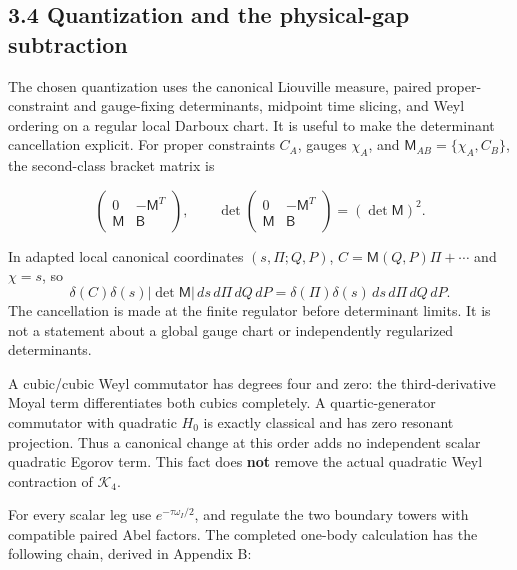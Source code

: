 \documentclass[a4paper,11pt]{article}
\numberwithin{equation}{section}
\begin{document}
\hypertarget{quantization-and-the-physical-gap-subtraction}{%
\subsection{3.4 Quantization and the physical-gap subtraction}\label{quantization-and-the-physical-gap-subtraction}}

The chosen quantization uses the canonical Liouville measure, paired proper-constraint and gauge-fixing determinants, midpoint time slicing, and Weyl ordering on a regular local Darboux chart. It is useful to make the determinant cancellation explicit. For proper constraints \(C_A\), gauges \(\chi_A\), and \(\mathsf M_{AB}=\{\chi_A,C_B\}\), the second-class bracket matrix is

\[
\begin{pmatrix}0&-\mathsf M^T\\ \mathsf M&\mathsf B\end{pmatrix},
\qquad
\det\begin{pmatrix}0&-\mathsf M^T\\ \mathsf M&\mathsf B\end{pmatrix}
=(\det\mathsf M)^2 .
\tag{3.14}
\]

In adapted local canonical coordinates \((s,\Pi;Q,P)\), \(C=\mathsf M(Q,P)\Pi+\cdots\) and \(\chi=s\), so \[
\delta(C)\delta(s)|\det\mathsf M|\,ds\,d\Pi\,dQ\,dP
=\delta(\Pi)\delta(s)\,ds\,d\Pi\,dQ\,dP .
\] The cancellation is made at the finite regulator before determinant limits. It is not a statement about a global gauge chart or independently regularized determinants.

A cubic/cubic Weyl commutator has degrees four and zero: the third-derivative Moyal term differentiates both cubics completely. A quartic-generator commutator with quadratic \(H_0\) is exactly classical and has zero resonant projection. Thus a canonical change at this order adds no independent scalar quadratic Egorov term. This fact does \textbf{not} remove the actual quadratic Weyl contraction of \(\mathcal K_4\).

For every scalar leg use \(e^{-\tau\omega_I/2}\), and regulate the two boundary towers with compatible paired Abel factors. The completed one-body calculation has the following chain, derived in Appendix B:
\end{document}
